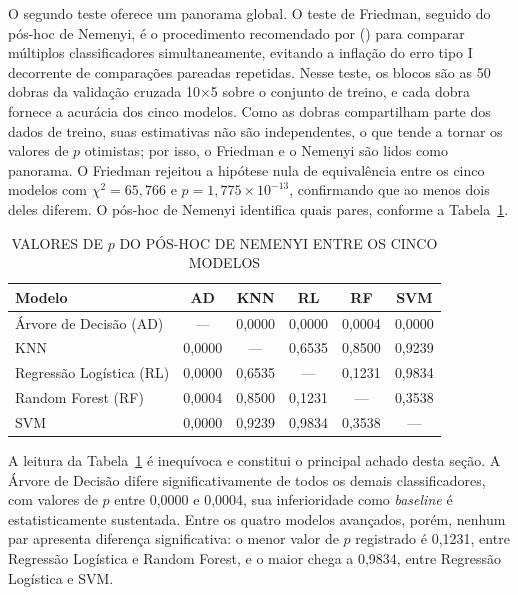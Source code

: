 \documentclass[
    12pt
    ,oneside
    ,a4paper
    ,chapter=TITLE
    ,section=TITLE
    ,sumario=abnt-6027-2012
    ,english,brazil]{abntex2} %
\begin{document}
O segundo teste oferece um panorama global. O teste de Friedman, seguido do pós-hoc de Nemenyi, é o procedimento recomendado por  (\citeyear{Demsar2006}) para comparar múltiplos classificadores simultaneamente, evitando a inflação do erro tipo I decorrente de comparações pareadas repetidas. Nesse teste, os blocos são as 50 dobras da validação cruzada 10×5 sobre o conjunto de treino, e cada dobra fornece a acurácia dos cinco modelos. Como as dobras compartilham parte dos dados de treino, suas estimativas não são independentes, o que tende a tornar os valores de $p$ otimistas; por isso, o Friedman e o Nemenyi são lidos como panorama. O Friedman rejeitou a hipótese nula de equivalência entre os cinco modelos com $\chi^2 = 65{,}766$ e $p = 1{,}775 \times 10^{-13}$, confirmando que ao menos dois deles diferem. O pós-hoc de Nemenyi identifica quais pares, conforme a Tabela~\ref{tab:nemenyi}.

\begin{table}[htbp]
    \centering
    \caption{VALORES DE $p$ DO PÓS-HOC DE NEMENYI ENTRE OS CINCO MODELOS}
    \label{tab:nemenyi}
    \begin{tabular}{@{}lccccc@{}}
        \toprule
        \textbf{Modelo} & \textbf{AD} & \textbf{KNN} & \textbf{RL} & \textbf{RF} & \textbf{SVM} \\
        \midrule
        Árvore de Decisão (AD)   & ---    & 0,0000 & 0,0000 & 0,0004 & 0,0000 \\
        KNN                      & 0,0000 & ---    & 0,6535 & 0,8500 & 0,9239 \\
        Regressão Logística (RL) & 0,0000 & 0,6535 & ---    & 0,1231 & 0,9834 \\
        Random Forest (RF)       & 0,0004 & 0,8500 & 0,1231 & ---    & 0,3538 \\
        SVM                      & 0,0000 & 0,9239 & 0,9834 & 0,3538 & ---    \\
        \bottomrule
    \end{tabular}
    \vspace{0.2cm}
    \fonteautor
\end{table}

A leitura da Tabela~\ref{tab:nemenyi} é inequívoca e constitui o principal
achado desta seção. A Árvore de Decisão difere significativamente de todos os
demais classificadores, com valores de $p$ entre 0,0000 e 0,0004, sua
inferioridade como \textit{baseline} é estatisticamente sustentada. Entre os
quatro modelos avançados, porém, nenhum par apresenta diferença significativa:
o menor valor de $p$ registrado é 0,1231, entre Regressão Logística e Random
Forest, e o maior chega a 0,9834, entre Regressão Logística e SVM.
\end{document}
